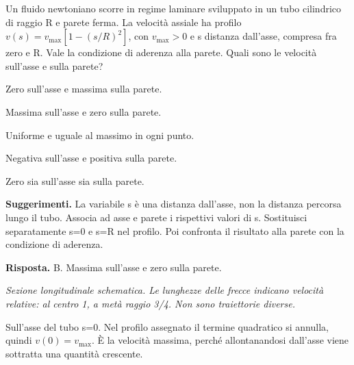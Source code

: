 \documentclass[11pt,a4paper]{article}
\begin{document}
\begin{samepage}
\par\smallskip
Un fluido newtoniano scorre in regime laminare sviluppato in un tubo cilindrico di raggio R e parete ferma. La velocità assiale ha profilo \(v(s)=v_{\max}[1-(s/R)^2]\), con \(v_{\max}>0\) e s distanza dall’asse, compresa fra zero e R. Vale la condizione di aderenza alla parete. Quali sono le velocità sull’asse e sulla parete?\par


\begin{list}{}{\setlength{\leftmargin}{1.4em}\setlength{\itemsep}{.1em}\setlength{\parsep}{0pt}}\small
\item[A.] Zero sull’asse e massima sulla parete.
\item[B.] Massima sull’asse e zero sulla parete.
\item[C.] Uniforme e uguale al massimo in ogni punto.
\item[D.] Negativa sull’asse e positiva sulla parete.
\item[E.] Zero sia sull’asse sia sulla parete.
\end{list}
{\small\textbf{Suggerimenti.} La variabile s è una distanza dall’asse, non la distanza percorsa lungo il tubo. Associa ad asse e parete i rispettivi valori di s. Sostituisci separatamente s=0 e s=R nel profilo. Poi confronta il risultato alla parete con la condizione di aderenza.\par}
\medskip\noindent\textbf{Risposta.} B. Massima sull’asse e zero sulla parete.\par

\begin{center}
\par
\small\itshape Sezione longitudinale schematica. Le lunghezze delle frecce indicano velocità relative: al centro 1, a metà raggio 3/4. Non sono traiettorie diverse.
\end{center}
Sull’asse del tubo s=0. Nel profilo assegnato il termine quadratico si annulla, quindi \(v(0)=v_{\max}\). È la velocità massima, perché allontanandosi dall’asse viene sottratta una quantità crescente.\par


\end{samepage}
\end{document}
